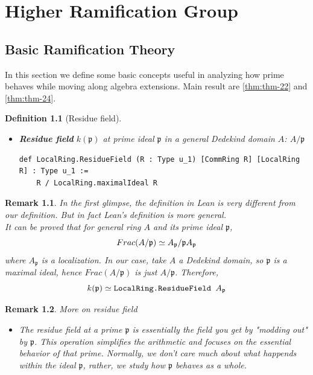 \chapter{Higher Ramification Group}
\label{cp:ramification}
\newtheorem{defi}{Definition}[chapter]
\newtheorem{rmk}{Remark}[chapter]
\providecommand*\thmautorefname{Theorem}

\section{Basic Ramification Theory}
In this section we define some basic concepts useful in analyzing how prime behaves while moving along algebra extensions. Main result are \autoref{thm:thm-22} and \autoref{thm:thm-24}.
\begin{defi}[Residue field]
    ~\begin{itemize}
        \item \textbf{Residue field} $k(\mathfrak{p})$ at prime ideal $\mathfrak{p}$ in a general Dedekind domain $A$: $A/\mathfrak{p}$
        \begin{listing}[!htpb]
        \begin{verbatim}
def LocalRing.ResidueField (R : Type u_1) [CommRing R] [LocalRing R] : Type u_1 :=
    R / LocalRing.maximalIdeal R
        \end{verbatim}
        \end{listing}
    \end{itemize}
\end{defi}
\begin{rmk}
    In the first glimpse, the definition in Lean is very different from our definition. But in fact Lean's definition is more general. \\
    It can be proved that for general ring $A$ and its prime ideal $\mathfrak{p}$,
    \begin{equation}
        \notag
        Frac(A/\mathfrak{p}) \simeq A_{\mathfrak{p}} / \mathfrak{p} A_{\mathfrak{p}}
    \end{equation}
    where $A_{\mathfrak{p}}$ is a localization.
    In our case, take $A$ a Dedekind domain, so $\mathfrak{p}$ is a maximal ideal, hence $Frac(A/\mathfrak{p})$ is just $A/\mathfrak{p}$. Therefore,
    \begin{equation}
        \notag
        k(\mathfrak{p}) \simeq \verb|LocalRing.ResidueField | A_{\mathfrak{p}}
    \end{equation}
\end{rmk}
\begin{rmk} More on residue field
~\begin{itemize}
    \item [] The residue field at a prime $\mathfrak{p}$ is essentially the field you get by "modding out" by $\mathfrak{p}$. This operation simplifies the arithmetic and focuses on the essential behavior of that prime. Normally, we don't care much about what happends within the ideal $\mathfrak{p}$, rather, we study how $\mathfrak{p}$ behaves as a whole.
\end{itemize}
\end{rmk}
